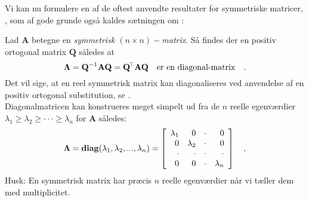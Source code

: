 Vi kan nu formulere en af de oftest anvendte resultater for symmetriske matricer, , som af gode grunde også kaldes sætningen om :

\begin{theorem} \label{thmSpektral}
Lad $\mathbf{A}$ betegne en {\em{symmetrisk $(n \times n)-$matrix}}. Så findes der en
positiv ortogonal matrix $\mathbf{Q}$ således at
\begin{equation}
\bm{\Lambda} = \mathbf{Q}^{-1}\mathbf{A}\mathbf{Q} = \mathbf{Q}\hspace*{-.6mm}^{\top} \mathbf{A}\mathbf{Q}\quad \textrm{er en diagonal-matrix} \quad .
\end{equation}
Det vil sige, at en reel symmetrisk matrix kan diagonaliseres ved anvendelse af en positiv ortogonal substitution, se  .\\

Diagonalmatricen kan konstrueres meget simpelt ud fra de $n$ reelle egenværdier  $\lambda_{1} \geq \lambda_{2} \geq \cdot \cdot \cdot \geq \lambda_{n}$ for $\mathbf{A}$ således:
\begin{equation}
\bm{\Lambda} = \operatorname{\bf{diag}}(\lambda_{1}, \lambda_{2}, . . . , \lambda_{n}) = \left[
                                                                        \begin{array}{rrrr}
                                                                          \lambda_{1} & 0 & \cdot & 0 \\
                                                                          0 &  \lambda_{2} & \cdot & 0 \\
                                                                          \cdot & \cdot & \cdot & \cdot \\
                                                                          0 & 0 & \cdot &  \lambda_{n} \\
                                                                        \end{array}
                                                                      \right]
\quad,
\end{equation}
Husk: En symmetrisk matrix har præcis $n$ reelle egenværdier når vi tæller dem med multiplicitet. \bs


\end{theorem}
